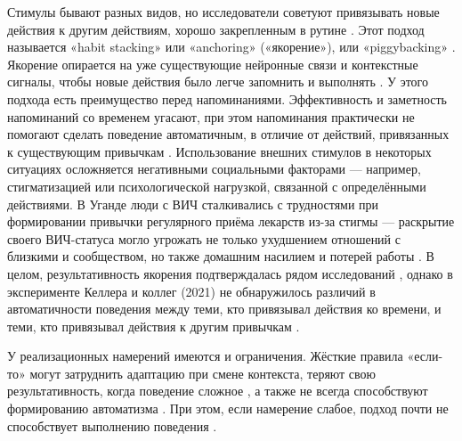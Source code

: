 \documentclass[pdflatex,sn-mathphys-num]{sn-jnl}%
\theoremstyle{thmstyleone}%
\theoremstyle{thmstyletwo}%
\theoremstyle{thmstylethree}%
\begin{document}
Стимулы бывают разных видов, но исследователи советуют привязывать новые действия к другим действиям, хорошо закрепленным в рутине \cite{judah_2012, BAYER2022101303, fiorella_2020}. Этот подход называется «habit stacking» или «anchoring» («якорение»), или «piggybacking» \cite{BUABANG202541, rd_what_2023, doi:10.1177/237946151600200109}. Якорение опирается на уже существующие нейронные связи и контекстные сигналы, чтобы новые действия было легче запомнить и выполнять \cite{verplanken_2005, zogg_2011, clear_how_2014}. У этого подхода есть преимущество перед напоминаниями. Эффективность и заметность напоминаний со временем угасают, при этом напоминания практически не помогают сделать поведение автоматичным, в отличие от действий, привязанных к существующим привычкам \cite{stawarz_beyond_2015}. Использование внешних стимулов в некоторых ситуациях осложняется негативными социальными факторами — например, стигматизацией или психологической нагрузкой, связанной с определёнными действиями. В Уганде люди с ВИЧ сталкивались с трудностями при формировании привычки регулярного приёма лекарств из-за стигмы — раскрытие своего ВИЧ-статуса могло угрожать не только ухудшением отношений с близкими и сообществом, но также домашним насилием и потерей работы \cite{Stecher2022Barriers}. В целом, результативность якорения подтверждалась рядом исследований \cite{fournier_2017, https://doi.org/10.1111/bjhp.12263, KELLER201753, Pimm01102016}, однако в эксперименте Келлера и коллег (2021) не обнаружилось различий в автоматичности поведения между теми, кто привязывал действия ко времени, и теми, кто привязывал действия к другим привычкам \cite{https://doi.org/10.1111/bjhp.12504}.

У реализационных намерений имеются и ограничения. Жёсткие правила «если-то» могут затруднить адаптацию при смене контекста, теряют свою результативность, когда поведение сложное \cite{VanTimmeren2022Instant}, а также не всегда способствуют формированию автоматизма \cite{Wicaksono2019Using}. При этом, если намерение слабое, подход почти не способствует выполнению поведения \cite{Prestwich01122003, doi:10.1177/0146167204271308}.
\end{document}
